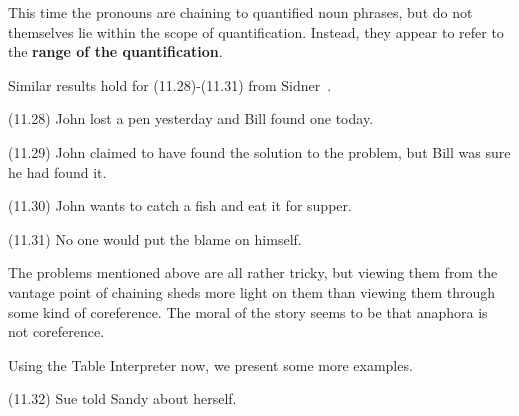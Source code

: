 \documentclass{article}
\begin{document}
This time the pronouns are chaining to quantified noun phrases,
but do not themselves lie within the scope of
quantification. Instead, they appear to refer to the
\textbf{range of the quantification}.

Similar results hold for (11.28)-(11.31) from
Sidner~\cite{Sidner79}.

\begin{enumerate*}
\item[(11.28)] John lost a pen yesterday and Bill found one
today.
\item[(11.29)] John claimed to have found the solution to the
problem, but Bill was sure he had found it.
\item[(11.30)] John wants to catch a fish and eat it for
supper.
\item[(11.31)] No one would put the blame on himself.
\end{enumerate*}

The problems mentioned above are all rather tricky, but viewing
them from the vantage point of chaining sheds more light on them
than viewing them through some kind of coreference. The moral of
the story seems to be that anaphora is not coreference.

Using the Table Interpreter now, we present some more examples.


\bigbreak
\begin{minipage}{\textwidth}
\begin{enumerate*}
\item[(11.32)] Sue told Sandy about herself.
\end{enumerate*}
\bigbreak
\end{minipage}
\bigbreak
\end{document}
